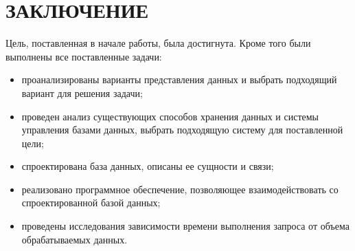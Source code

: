 \chapter*{ЗАКЛЮЧЕНИЕ}

Цель, поставленная в начале работы, была достигнута. Кроме того были выполнены все поставленные задачи:
\begin{itemize}
	\item проанализированы варианты представления данных и выбрать подходящий вариант для решения задачи;
	\item проведен анализ существующих способов хранения данных и системы управления базами данных, выбрать подходящую систему для поставленной цели;
	\item спроектирована база данных, описаны ее сущности и связи;
	\item реализовано программное обеспечение, позволяющее взаимодействовать со спроектированной базой данных;
	\item проведены исследования зависимости времени выполнения запроса от объема обрабатываемых данных.  
\end{itemize}

